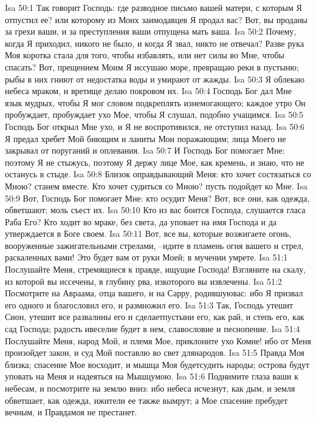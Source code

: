 Isa 50:1  Так говорит Господь: где разводное письмо вашей матери, с которым Я отпустил ее? или которому из Моих заимодавцев Я продал вас? Вот, вы проданы за грехи ваши, и за преступления ваши отпущена мать ваша.
Isa 50:2  Почему, когда Я приходил, никого не было, и когда Я звал, никто не отвечал? Разве рука Моя коротка стала для того, чтобы избавлять, или нет силы во Мне, чтобы спасать? Вот, прещением Моим Я иссушаю море, превращаю реки в пустыню; рыбы в них гниют от недостатка воды и умирают от жажды.
Isa 50:3  Я облекаю небеса мраком, и вретище делаю покровом их.
Isa 50:4  Господь Бог дал Мне язык мудрых, чтобы Я мог словом подкреплять изнемогающего; каждое утро Он пробуждает, пробуждает ухо Мое, чтобы Я слушал, подобно учащимся.
Isa 50:5  Господь Бог открыл Мне ухо, и Я не воспротивился, не отступил назад.
Isa 50:6  Я предал хребет Мой биющим и ланиты Мои поражающим; лица Моего не закрывал от поруганий и оплевания.
Isa 50:7  И Господь Бог помогает Мне: поэтому Я не стыжусь, поэтому Я держу лице Мое, как кремень, и знаю, что не останусь в стыде.
Isa 50:8  Близок оправдывающий Меня: кто хочет состязаться со Мною? станем вместе. Кто хочет судиться со Мною? пусть подойдет ко Мне.
Isa 50:9  Вот, Господь Бог помогает Мне: кто осудит Меня? Вот, все они, как одежда, обветшают; моль съест их.
Isa 50:10  Кто из вас боится Господа, слушается гласа Раба Его? Кто ходит во мраке, без света, да уповает на имя Господа и да утверждается в Боге своем.
Isa 50:11  Вот, все вы, которые возжигаете огонь, вооруженные зажигательными стрелами, --идите в пламень огня вашего и стрел, раскаленных вами! Это будет вам от руки Моей; в мучении умрете.
Isa 51:1  Послушайте Меня, стремящиеся к правде, ищущие Господа! Взгляните на скалу, из которой вы иссечены, в глубину рва, изкоторого вы извлечены.
Isa 51:2  Посмотрите на Авраама, отца вашего, и на Сарру, родившуювас: ибо Я призвал его одного и благословил его, и размножил его.
Isa 51:3  Так, Господь утешит Сион, утешит все развалины его и сделаетпустыни его, как рай, и степь его, как сад Господа; радость ивеселие будет в нем, славословие и песнопение.
Isa 51:4  Послушайте Меня, народ Мой, и племя Мое, приклоните ухо Комне! ибо от Меня произойдет закон, и суд Мой поставлю во свет длянародов.
Isa 51:5  Правда Моя близка; спасение Мое восходит, и мышца Моя будетсудить народы; острова будут уповать на Меня и надеяться на Мышцумою.
Isa 51:6  Поднимите глаза ваши к небесам, и посмотрите на землю вниз: ибо небеса исчезнут, как дым, и земля обветшает, как одежда, ижители ее также вымрут; а Мое спасение пребудет вечным, и Правдамоя не престанет.
